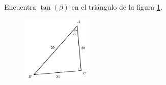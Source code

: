 Encuentra $\tan(\beta)$ en el triángulo de la figura \ref{fig:functrig18}.
\begin{figure}[H]
    \begin{center}
        \includegraphics[width=0.3\textwidth]{../images/functrig18.png}
    \end{center}
    \caption{}
    \label{fig:functrig18}
\end{figure}

